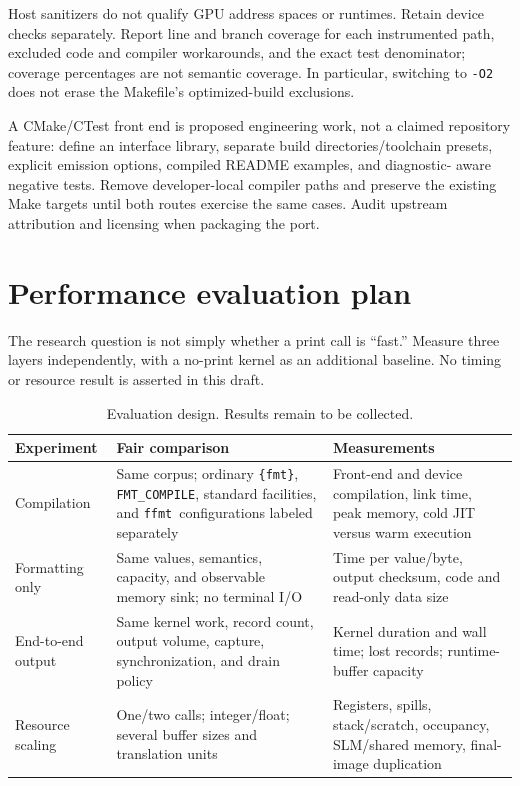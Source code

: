 \documentclass[11pt,letterpaper]{article}
\newcommand{\ffmt}{\texttt{ffmt}}
\newcommand{\fmtlib}{\texttt{\{fmt\}}}
\begin{document}
Host sanitizers do not qualify GPU address spaces or runtimes. Retain device
checks separately. Report line and branch coverage for each instrumented
path, excluded code and compiler workarounds, and the exact test denominator;
coverage percentages are not semantic coverage. In particular, switching to
\texttt{-O2} does not erase the Makefile's optimized-build exclusions.

A CMake/CTest front end is proposed engineering work, not a claimed repository
feature: define an interface library, separate build directories/toolchain
presets, explicit emission options, compiled README examples, and diagnostic-
aware negative tests. Remove developer-local compiler paths and preserve the
existing Make targets until both routes exercise the same cases. Audit
upstream attribution and licensing when packaging the port.

\section{Performance evaluation plan}

The research question is not simply whether a print call is ``fast.'' Measure
three layers independently, with a no-print kernel as an additional baseline.
No timing or resource result is asserted in this draft.

\begin{table}[!htbp]
\centering\small
\begin{tabularx}{\linewidth}{@{}P{2.6cm} Y Y@{}}
\toprule
Experiment & Fair comparison & Measurements \\
\midrule
Compilation & Same corpus; ordinary \fmtlib, \texttt{FMT\_COMPILE}, standard facilities, and \ffmt\ configurations labeled separately & Front-end and device compilation, link time, peak memory, cold JIT versus warm execution \\
Formatting only & Same values, semantics, capacity, and observable memory sink; no terminal I/O & Time per value/byte, output checksum, code and read-only data size \\
End-to-end output & Same kernel work, record count, output volume, capture, synchronization, and drain policy & Kernel duration and wall time; lost records; runtime-buffer capacity \\
Resource scaling & One/two calls; integer/float; several buffer sizes and translation units & Registers, spills, stack/scratch, occupancy, SLM/shared memory, final-image duplication \\
\bottomrule
\end{tabularx}
\caption{Evaluation design. Results remain to be collected.}
\label{tab:performance}
\end{table}
\end{document}
